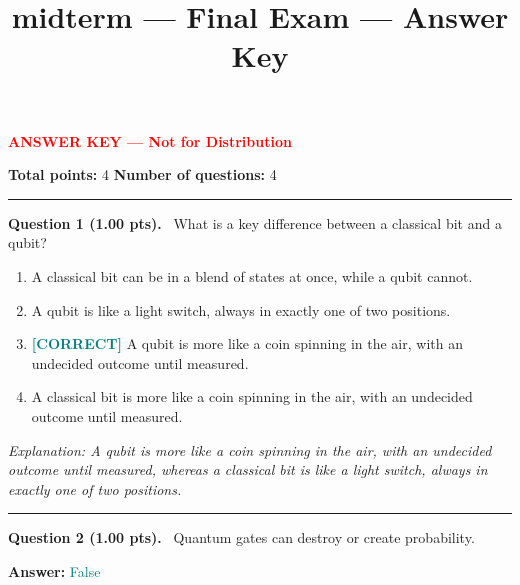 \documentclass[12pt,a4paper]{article}
\title{midterm --- Final Exam --- Answer Key}
\date{}
\begin{document}
\maketitle

{\large \textbf{\textcolor{red}{ANSWER KEY --- Not for Distribution}}}

\vspace{0.5em}



\noindent
\textbf{Total points:} 4
\hfill
\textbf{Number of questions:} 4

\vspace{1em}
\hrule
\vspace{1.5em}


\noindent
\textbf{Question 1 (1.00 pts).}~
What is a key difference between a classical bit and a qubit?


\begin{enumerate}[label=\textbf{\Alph*.}]

  \item A classical bit can be in a blend of states at once, while a qubit cannot.

  \item A qubit is like a light switch, always in exactly one of two positions.

  \item \textbf{\textcolor{teal}{[CORRECT]}}  A qubit is more like a coin spinning in the air, with an undecided outcome until measured.

  \item A classical bit is more like a coin spinning in the air, with an undecided outcome until measured.

\end{enumerate}



\textit{\small Explanation: A qubit is more like a coin spinning in the air, with an undecided outcome until measured, whereas a classical bit is like a light switch, always in exactly one of two positions.}



\vspace{0.8em}
\noindent\rule{\linewidth}{0.2pt}
\vspace{0.3em}


\noindent
\textbf{Question 2 (1.00 pts).}~
Quantum gates can destroy or create probability.


\textbf{Answer:} \textcolor{teal}{False}
\end{document}
